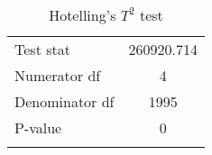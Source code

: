 \begin{table}[h]
\centering
\caption{Hotelling's $T^2$ test}\label{tab:hotelling}
\begin{tabular}{lc}
 \hline 
Test stat &260920.714\\
Numerator df & 4\\
Denominator df & 1995\\
P-value & 0\\\hline\\
\end{tabular}
\end{table}

